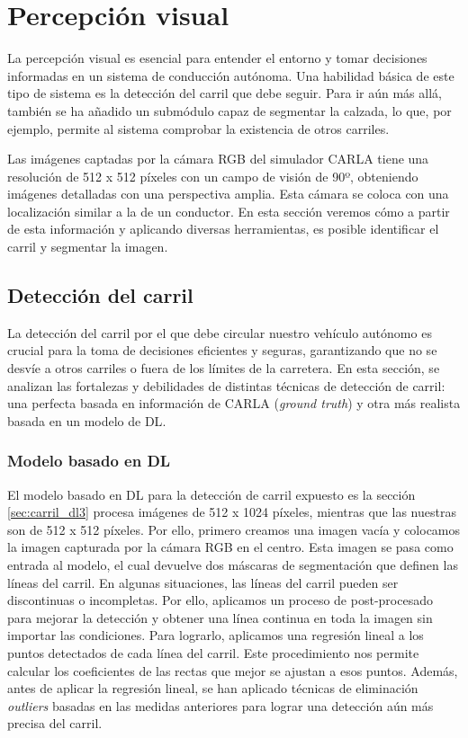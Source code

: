 \section{Percepción visual}

La percepción visual es esencial para entender el entorno y tomar decisiones informadas en un sistema de conducción autónoma. Una habilidad básica de este tipo de sistema es la detección del carril que debe seguir. Para ir aún más allá, también se ha añadido un submódulo capaz de segmentar la calzada, lo que, por ejemplo, permite al sistema comprobar la existencia de otros carriles.

Las imágenes captadas por la cámara RGB del simulador CARLA tiene una resolución de 512 x 512 píxeles con un campo de visión de 90º, obteniendo imágenes detalladas con una perspectiva amplia. Esta cámara se coloca con una localización similar a la de un conductor. En esta sección veremos cómo a partir de esta información y aplicando diversas herramientas, es posible identificar el carril y segmentar la imagen.

\subsection{Detección del carril}

La detección del carril por el que debe circular nuestro vehículo autónomo es crucial para la toma de decisiones eficientes y seguras, garantizando que no se desvíe a otros carriles o fuera de los límites de la carretera. En esta sección, se analizan las fortalezas y debilidades de distintas técnicas de detección de carril: una perfecta basada en información de CARLA (\textit{ground truth}) y otra más realista basada en un modelo de \ac{DL}.

\subsubsection{Modelo basado en \ac{DL}}

El modelo basado en \ac{DL} para la detección de carril expuesto es la sección \ref{sec:carril_dl3} procesa imágenes de 512 x 1024 píxeles, mientras que las nuestras son de 512 x 512 píxeles. Por ello, primero creamos una imagen vacía y colocamos la imagen capturada por la cámara RGB en el centro. Esta imagen se pasa como entrada al modelo, el cual devuelve dos máscaras de segmentación que definen las líneas del carril. En algunas situaciones, las líneas del carril pueden ser discontinuas o incompletas. Por ello, aplicamos un proceso de post-procesado para mejorar la detección y obtener una línea continua en toda la imagen sin importar las condiciones. Para lograrlo, aplicamos una regresión lineal a los puntos detectados de cada línea del carril. Este procedimiento nos permite calcular los coeficientes de las rectas que mejor se ajustan a esos puntos. Además, antes de aplicar la regresión lineal, se han aplicado técnicas de eliminación \textit{outliers} basadas en las medidas anteriores para lograr una detección aún más precisa del carril. 

